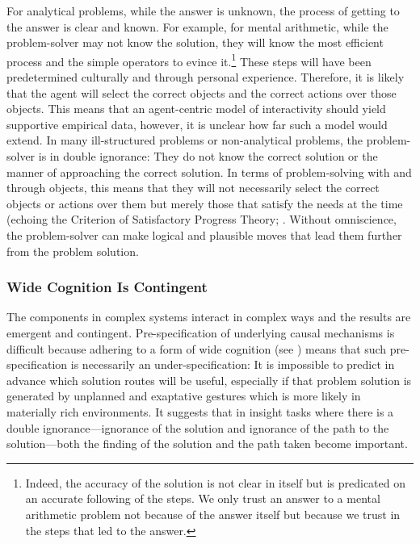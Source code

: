 \documentclass{article}
\begin{document}
For analytical problems, while the answer is unknown, the process of getting to the answer is clear and known. For example, for mental arithmetic, while the problem-solver may not know the solution, they will know the most efficient process and the simple operators to evince it.\footnote{Indeed, the accuracy of the solution is not clear in itself but is predicated on an accurate following of the steps. We only trust an answer to a mental arithmetic problem not because of the answer itself but because we trust in the steps that led to the answer.} These steps will have been predetermined culturally and through personal experience. Therefore, it is likely that the agent will select the correct objects and the correct actions over those objects. This means that an agent-centric model of interactivity should yield supportive empirical data, however, it is unclear how far such a model would extend. In many ill-structured problems or non-analytical problems, the problem-solver is in double ignorance: They do not know the correct solution or the manner of approaching the correct solution. In terms of problem-solving with and through objects, this means that they will not necessarily select the correct objects or actions over them but merely those that satisfy the needs at the time (echoing the Criterion of Satisfactory Progress Theory; \parencite{MacGregor2001, Ormerod2013}. Without omniscience, the problem-solver can make logical and plausible moves that lead them further from the problem solution. 

\subsubsection{Wide Cognition Is Contingent}

The components in complex systems interact in complex ways and the results are emergent and contingent. Pre-specification of underlying causal mechanisms is difficult because adhering to a form of wide cognition (see \parencite{Wilson2009}) means that such pre-specification is necessarily an under-specification: It is impossible to predict in advance which solution routes will be useful, especially if that problem solution is generated by unplanned and exaptative gestures which is more likely in materially rich environments. It suggests that in insight tasks where there is a double ignorance—ignorance of the solution and ignorance of the path to the solution—both the finding of the solution and the path taken become important. 
\end{document}
